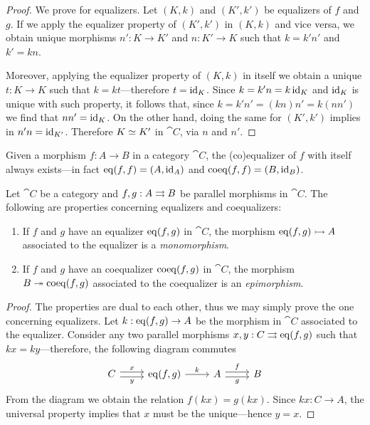 \begin{proof}
We prove for equalizers. Let \((K, k)\) and \((K', k')\) be equalizers of \(f\)
and \(g\). If we apply the equalizer property of \((K', k')\) in \((K, k)\) and
vice versa, we obtain unique morphisms \(n': K \to K'\) and \(n: K' \to K\) such
that \(k = k' n'\) and \(k' = k n\).

Moreover, applying the equalizer property of \((K, k)\) in itself we obtain a
unique \(t: K \to K\) such that \(k = k t\)---therefore \(t = \operatorname{id}_K\). Since
\(k = k' n = k \operatorname{id}_K\) and \(\operatorname{id}_K\) is unique with such property, it follows
that, since \(k = k' n' = (k n) n' = k (n n')\) we find that \(n n' =
\operatorname{id}_K\). On the other hand, doing the same for \((K', k')\) implies in \(n' n =
\operatorname{id}_{K'}\). Therefore \(K \simeq K'\) in \(\cat C\), via \(n\) and \(n'\).
\end{proof}

\begin{corollary}
\label{cor:self-(co)equalizer}
Given a morphism \(f: A \to B\) in a category \(\cat C\), the (co)equalizer of
\(f\) with itself always exists---in fact \(\operatorname{eq}(f, f) = (A, \operatorname{id}_A)\) and
\(\operatorname{coeq}(f, f) = (B, \operatorname{id}_{B})\).
\end{corollary}

\begin{proposition}
\label{prop:eq-monic-coeq-epic}
Let \(\cat C\) be a category and \(f, g: A \rightrightarrows B\) be parallel morphisms in
\(\cat C\). The following are properties concerning equalizers and coequalizers:
\begin{enumerate}\setlength\itemsep{0em}
\item If \(f\) and \(g\) have an equalizer \(\operatorname{eq}(f, g)\) in \(\cat C\), the
  morphism \(\operatorname{eq}(f, g) \rightarrowtail A\) associated to the equalizer is a
  \emph{monomorphism}.

\item If \(f\) and \(g\) have an coequalizer \(\operatorname{coeq}(f, g)\) in \(\cat C\), the
  morphism \(B \twoheadrightarrow \operatorname{coeq}(f, g)\) associated to the coequalizer is an
  \emph{epimorphism}.
\end{enumerate}
\end{proposition}

\begin{proof}
The properties are dual to each other, thus we may simply prove the one
concerning equalizers. Let \(k: \operatorname{eq}(f, g) \to A\) be the morphism in \(\cat C\)
associated to the equalizer. Consider any two parallel morphisms \(x, y: C \rightrightarrows
\operatorname{eq}(f, g)\) such that \(k x = k y\)---therefore, the following diagram
commutes
\[
\begin{tikzcd}
C \ar[r, shift left, "x"] \ar[r, shift right, "y"']
& \Eq(f, g) \ar[r, "k"]
& A \ar[r, shift left, "f"] \ar[r, shift right, "g"']
& B
\end{tikzcd}
\]
From the diagram we obtain the relation \(f (k x) = g (k x)\). Since \(k x: C
\to A\), the universal property implies that \(x\) must be the unique---hence
\(y = x\).
\end{proof}

